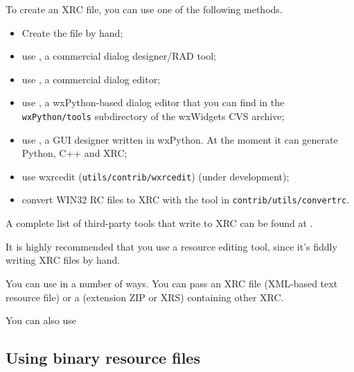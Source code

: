 To create an XRC file, you can use one of the following methods.

\begin{itemize}\itemsep=0pt
\item Create the file by hand;
\item use , a commercial dialog designer/RAD tool;
\item use , a commercial dialog editor;
\item use , a wxPython-based
dialog editor that you can find in the {\tt wxPython/tools} subdirectory of the wxWidgets
CVS archive;
\item use , a GUI designer written in wxPython. At the moment it can generate Python, C++ and XRC;
\item use wxrcedit ({\tt utils/contrib/wxrcedit}) (under development);
\item convert WIN32 RC files to XRC with the tool in {\tt contrib/utils/convertrc}.
\end{itemize}

A complete list of third-party tools that write to XRC can be found at .

It is highly recommended that you use a resource editing tool, since it's fiddly writing
XRC files by hand.

You can use  in a number of ways.
You can pass an XRC file (XML-based text resource file)
or a  (extension ZIP or XRS) containing other XRC.

You can also use 

\subsection{Using binary resource files}\label{binaryresourcefiles}

